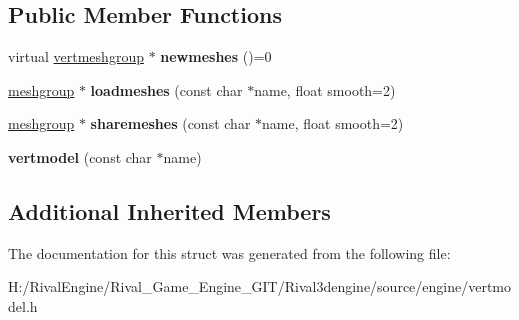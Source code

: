 \subsection*{Public Member Functions}
\begin{DoxyCompactItemize}
\item 
\mbox{\label{structvertmodel_a31ac9962c81f03ec638d6014b5cf2f75}} 
virtual \hyperlink{structvertmodel_1_1vertmeshgroup}{vertmeshgroup} $\ast$ {\bfseries newmeshes} ()=0
\item 
\mbox{\label{structvertmodel_ac02cda45bfe19ead2df6aefb0a4de843}} 
\hyperlink{structanimmodel_1_1meshgroup}{meshgroup} $\ast$ {\bfseries loadmeshes} (const char $\ast$name, float smooth=2)
\item 
\mbox{\label{structvertmodel_ac3becea7cb61e73f1ac7b34057d2592f}} 
\hyperlink{structanimmodel_1_1meshgroup}{meshgroup} $\ast$ {\bfseries sharemeshes} (const char $\ast$name, float smooth=2)
\item 
\mbox{\label{structvertmodel_a794b4a61e9ce6d7c64b00b36dc723c1e}} 
{\bfseries vertmodel} (const char $\ast$name)
\end{DoxyCompactItemize}
\subsection*{Additional Inherited Members}


The documentation for this struct was generated from the following file\+:\begin{DoxyCompactItemize}
\item 
H\+:/\+Rival\+Engine/\+Rival\+\_\+\+Game\+\_\+\+Engine\+\_\+\+G\+I\+T/\+Rival3dengine/source/engine/vertmodel.\+h\end{DoxyCompactItemize}
